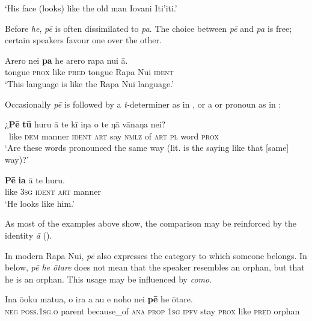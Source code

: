 \glt
‘His face (looks) like the old man Iovani Iti’iti.’ \textstyleExampleref{[R416.1180]}
\z

Before \textit{he}, \textit{pē} is often dissimilated to \textit{pa}. The choice between \textit{pē} and \textit{pa} is free; certain speakers favour one over the other.

\ea\label{ex:4.293}
\gll {\ꞌ}Arero nei \textbf{pa} he {\ꞌ}arero rapa nui {\ꞌ}ā. \\
tongue \textsc{prox} like \textsc{pred} tongue Rapa Nui \textsc{ident} \\

\glt
‘This language is like the Rapa Nui language.’\textstyleExampleref{ [R231.272]} 
\z

Occasionally \textit{pē} is followed by a \textit{t-}determiner as in , or a  or pronoun as in :

\ea\label{ex:4.294}
\gll ¿\textbf{Pē} \textbf{tū} huru {\ꞌ}ā te kī iŋa o te ŋā vānaŋa nei?\\
~like \textsc{dem} manner \textsc{ident} \textsc{art} say \textsc{nmlz} of \textsc{art} \textsc{pl} word \textsc{prox}\\

\glt 
‘Are these words pronounced the same way (lit. is the saying like that [same] way)?’ \textstyleExampleref{[R615.231]} 
\z

\ea\label{ex:4.295}
\gll \textbf{Pē} \textbf{ia} {\ꞌ}ā te huru. \\
like \textsc{3sg} \textsc{ident} \textsc{art} manner  \\

\glt
‘He looks like him.’ \textstyleExampleref{[R415.886]} 
\z

As most of the examples above show, the comparison may be reinforced by the identity  \textit{{\ꞌ}ā} ().

In modern Rapa Nui, \textit{pē} also expresses the category to which someone belongs. In  below, \textit{pē he {\ꞌ}ōtare} does not mean that the speaker resembles an orphan, but that he is an orphan. This usage may be influenced by  \textit{como}.

\ea\label{ex:4.296}
\gll {\ꞌ}Ina ō{\ꞌ}oku matu{\ꞌ}a, {\ꞌ}o ira a au e noho nei \textbf{pē} he {\ꞌ}ōtare. \\
\textsc{neg} \textsc{poss.1sg.o} parent because\_of \textsc{ana} \textsc{prop} \textsc{1sg} \textsc{ipfv} stay \textsc{prox} like \textsc{pred} orphan \\

